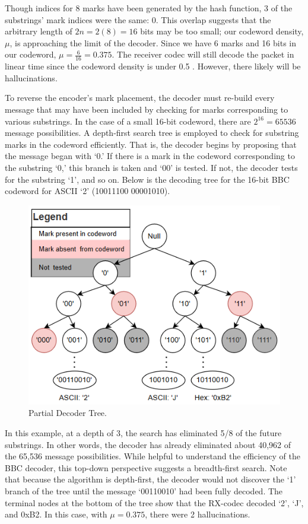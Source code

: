 \documentclass[conference]{IEEEtran}
\begin{document}
Though indices for 8 marks have been generated by the hash function, 3 of the substrings’ mark indices were the same: 0. This overlap suggests that the arbitrary length of $2n=2(8)=16$ bits may be too small; our codeword density, $\mu$, is approaching the limit of the decoder. Since we have 6 marks and 16 bits in our codeword, $\mu=\frac{6}{16}=0.375$. The receiver codec will still decode the packet in linear time since the codeword density is under 0.5 \cite{thesis}. However, there likely will be hallucinations.   

 To reverse the encoder’s mark placement, the decoder must re-build every message that may have been included by checking for marks corresponding to various substrings. In the case of a small 16-bit codeword, there are $2^{16}=65536$ message possibilities. A depth-first search tree is employed to check for substring marks in the codeword efficiently. That is, the decoder begins by proposing that the message began with ‘0.’ If there is a mark in the codeword corresponding to the substring ‘0,’ this branch is taken and ‘00’ is tested. If not, the decoder tests for the substring ‘1’, and so on. Below is the decoding tree for the 16-bit BBC codeword for ASCII ‘2’ (10011100  00001010).  

 \begin{figure}[h]
     \centering
     \includegraphics[scale=.59]{images/decoder_search_tree.png}
     \caption{Partial Decoder Tree. }
     \label{treeimag}
 \end{figure}

In this example, at a depth of 3, the search has eliminated 5/8 of the future substrings. In other words, the decoder has already eliminated about 40,962 of the 65,536 message possibilities. While helpful to understand the efficiency of the BBC decoder, this top-down perspective suggests a breadth-first search. Note that because the algorithm is depth-first, the decoder would not discover the ‘1’ branch of the tree until the message ‘00110010’ had been fully decoded. The terminal nodes at the bottom of the tree show that the RX-codec decoded ‘2’, ‘J’, and 0xB2. In this case, with $\mu=0.375$, there were 2 hallucinations.
 
\end{document}
